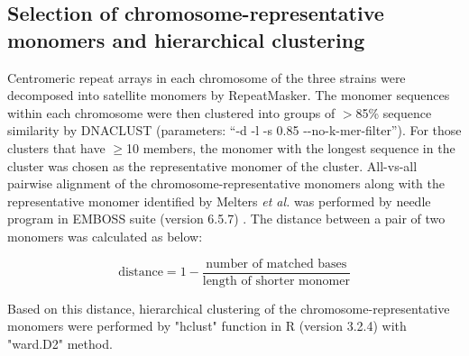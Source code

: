 \subsection*{Selection of chromosome-representative monomers and hierarchical clustering}
  Centromeric repeat arrays in each chromosome of the three strains were decomposed into satellite monomers by RepeatMasker. The monomer sequences within each chromosome were then clustered into groups of $>$85\% sequence similarity by DNACLUST \cite{Ghodsi2011} (parameters: ``-d -l -s 0.85 {-}{-}no-k-mer-filter''). For those clusters that have $\geq$10 members, the monomer with the longest sequence in the cluster was chosen as the representative monomer of the cluster. All-vs-all pairwise alignment of the chromosome-representative monomers along with the representative monomer identified by Melters \textit{et al.} \cite{Melters2013} was performed by needle program in EMBOSS suite (version 6.5.7) \cite{Rice2000}. The distance between a pair of two monomers was calculated as below:

  \[
    \mbox{distance} = 1 - \frac{\mbox{number of matched bases}}{\mbox{length of shorter monomer}}
  \]

  Based on this distance, hierarchical clustering of the chromosome-representative monomers were performed by "hclust" function in R (version 3.2.4) with "ward.D2" method.
